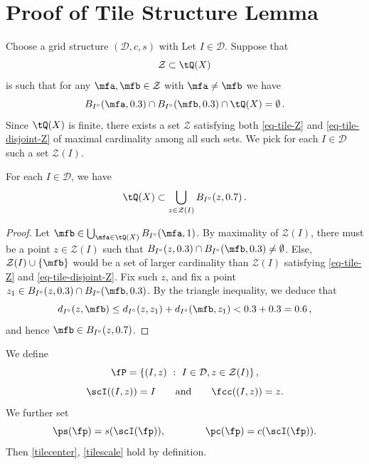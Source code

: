 \section{Proof of Tile Structure Lemma}
\label{subsectiles}
Choose a grid structure $(\mathcal{D}, c, s)$ with 
Let $I \in \mathcal{D}$. Suppose that
\begin{equation}
    \label{eq-tile-Z}
    \mathcal{Z} \subset \tQ(X)
\end{equation}
is such that for any $\mfa, \mfb \in \mathcal{Z}$ with $\mfa\ne \mfb$ we have
\begin{equation}
    \label{eq-tile-disjoint-Z}
    B_{I^\circ}(\mfa, 0.3) \cap B_{I^\circ}(\mfb, 0.3) \cap \tQ(X) = \emptyset\,.
\end{equation}
Since $\tQ(X)$ is finite, there exists a set $\mathcal{Z}$ satisfying both \eqref{eq-tile-Z} and \eqref{eq-tile-disjoint-Z} of maximal cardinality among all such sets. We pick for each $I \in \mathcal{D}$ such a set $\mathcal{Z}(I)$.

\begin{lemma}
    \label{frequency-ball-cover}
    \leanok
    For each $I \in \mathcal{D}$, we have
    \begin{equation}
        \label{eq-tile-cover}
        \tQ(X) \subset \bigcup_{z \in \mathcal{Z}(I)} B_{I^\circ}(z, 0.7)\,.
    \end{equation}
\end{lemma}

\begin{proof}
    \leanok
    Let $\mfb \in \bigcup_{\mfa \in \tQ(X)} B_{I^\circ}(\mfa, 1)$. By maximality of $\mathcal{Z}(I)$, there must be a point $z \in \mathcal{Z}(I)$ such that $B_{I^\circ}(z, 0.3) \cap B_{I^\circ}(\mfb, 0.3) \ne \emptyset$. Else, $\mathcal{Z}(I) \cup \{\mfb\}$ would be a set of larger cardinality than $\mathcal{Z}(I)$ satisfying \eqref{eq-tile-Z} and \eqref{eq-tile-disjoint-Z}. Fix such $z$, and fix a point $z_1 \in B_{I^\circ}(z, 0.3) \cap B_{I^\circ}(\mfb, 0.3)$. By the triangle inequality, we deduce that
    $$
        d_{I^\circ}(z,\mfb) \le d_{I^\circ}(z,z_1) + d_{I^\circ}(\mfb, z_1) < 0.3 + 0.3 = 0.6\,,
    $$
    and hence $\mfb \in B_{I^\circ}(z, 0.7)$.
\end{proof}

We define
$$
    \fP = \{(I, z) \ : \ I \in \mathcal{D}, z \in \mathcal{Z}(I)\}\,,
$$
$$\scI((I, z)) = I\qquad \text{and} \qquad \fcc((I, z)) = z.$$ We further set $$\ps(\fp) = s(\scI(\fp)),\qquad \qquad \pc(\fp) = c(\scI(\fp)).$$ Then \eqref{tilecenter}, \eqref{tilescale} hold by definition.

